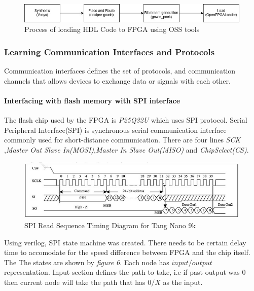 \documentclass[a4paper,12pt]{article}
\begin{document}
    \begin{figure}[H]
        \centering
        \includegraphics[width=1\textwidth]{./images/oss-process.jpeg}
        \caption{Process of loading HDL Code to FPGA using OSS tools}
    \end{figure}

    \subsubsection{Learning Communication Interfaces and Protocols}
    Communication interfaces defines the set of protocols, and communication channels that allows devices to exchange data or signals with each other. 

    \paragraph{Interfacing with flash memory with SPI interface}
    
    The flash chip used by the FPGA is \textit{P25Q32U} which uses SPI protocol. Serial Peripheral Interface(SPI) is synchronous serial communication interface commonly used for short-distance communication. There are four lines \textit{SCK} ,\textit{Master Out Slave In(MOSI)},\textit{Master In Slave Out(MISO)} and \textit{ChipSelect(CS)}. 

    \begin{figure}[H]
        \centering
        \includegraphics[width=1\textwidth]{./images/spi_flash.png}
        \caption{SPI Read Sequence Timing Diagram for Tang Nano 9k}
    \end{figure}

    Using verilog, SPI state machine was created. There needs to be certain delay time to accomodate for the speed difference between FPGA and the chip itself. The The states are shown by \textit{figure 6}. Each node has \textit{$input/output$} representation. Input section defines the path to take, i.e if past output was 0 then current node will take the path that has \textit{$0/X$} as the input. 
\end{document}
